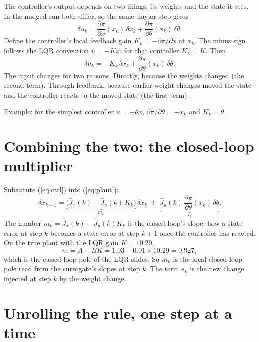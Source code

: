 \documentclass[11pt]{article}
\begin{document}
The controller's output depends on two things: its weights and the state it sees. In the nudged run both differ, so the same Taylor step gives
\begin{equation}
\delta u_k=\frac{\partial \pi}{\partial x}(x_k)\,\delta x_k+\frac{\partial \pi}{\partial \theta}(x_k)\,\delta\theta .
\end{equation}
Define the controller's local feedback gain $K_k=-\partial\pi/\partial x$ at $x_k$. The minus sign follows the LQR convention $u=-Kx$: for that controller $K_k=K$. Then
\begin{equation}\label{eq:ctrl}
\delta u_k=-K_k\,\delta x_k+\frac{\partial \pi}{\partial \theta}(x_k)\,\delta\theta .
\end{equation}
The input changes for two reasons. Directly, because the weights changed (the second term). Through feedback, because earlier weight changes moved the state and the controller reacts to the moved state (the first term).

Example: for the simplest controller $u=-\theta x$, $\partial\pi/\partial\theta=-x_k$ and $K_k=\theta$.

\section{Combining the two: the closed-loop multiplier}

Substitute (\ref{eq:ctrl}) into (\ref{eq:plant}):
\begin{equation}\label{eq:closed}
\delta x_{k+1}=\underbrace{\big(\hat J_x(k)-\hat J_u(k)\,K_k\big)}_{m_k}\,\delta x_k\;+\;\underbrace{\hat J_u(k)\,\frac{\partial \pi}{\partial \theta}(x_k)\,\delta\theta}_{s_k}.
\end{equation}
The number $m_k=\hat J_x(k)-\hat J_u(k)K_k$ is the closed loop's slope: how a state error at step $k$ becomes a state error at step $k+1$ once the controller has reacted. On the true plant with the LQR gain $K=10.29$,
\begin{equation}
m=A-BK=1.03-0.01\times10.29=0.927,
\end{equation}
which is the closed-loop pole of the LQR slides. So $m_k$ is the local closed-loop pole read from the surrogate's slopes at step $k$. The term $s_k$ is the new change injected at step $k$ by the weight change.

\section{Unrolling the rule, one step at a time}
\end{document}
